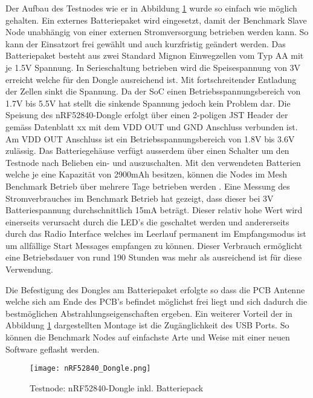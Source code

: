 Der Aufbau des Testnodes wie er in Abbildung \ref{fig:TestnodenRF52840-DongleinklBatteriepack} wurde so einfach wie möglich gehalten. Ein externes Batteriepaket wird eingesetzt, damit der Benchmark Slave Node unabhängig von einer externen Stromversorgung betrieben werden kann. So kann der Einsatzort frei gewählt und auch kurzfristig geändert werden.
Das Batteriepaket besteht aus zwei Standard Mignon Einwegzellen vom Typ AA mit je 1.5V Spannung. In Serieschaltung betrieben wird die Speisespannung von 3V erreicht welche für den Dongle ausreichend ist. Mit fortschreitender Entladung der Zellen sinkt die Spannung. Da der SoC einen Betriebsspannungsbereich von 1.7V bis 5.5V hat stellt die sinkende Spannung jedoch kein Problem dar.
Die Speisung des nRF52840-Dongle erfolgt über einen 2-poligen JST Header der gemäss Datenblatt xx mit dem VDD OUT und GND Anschluss verbunden ist. Am VDD OUT Anschluss ist ein Betriebsspannungsbereich von 1.8V bis 3.6V zulässig.
Das Batteriegehäuse verfügt ausserdem über einen Schalter um den Testnode nach Belieben ein- und auszuschalten.
Mit den verwendeten Batterien welche je eine Kapazität von 2900mAh besitzen, können die Nodes im Mesh Benchmark Betrieb über mehrere Tage betrieben werden \cite{distrelec_schweiz_ag_rnd_2020}.
Eine Messung des Stromverbrauches im Benchmark Betrieb hat gezeigt, dass dieser bei 3V Batteriespannung durchschnittlich 15mA beträgt. Dieser relativ hohe Wert wird einerseits verursacht durch die LED's die geschaltet werden und andererseits durch das Radio Interface welches im Leerlauf permanent im Empfangsmodus ist um allfällige Start Messages empfangen zu können. 
Dieser Verbrauch ermöglicht eine Betriebsdauer von rund 190 Stunden was mehr als ausreichend ist für diese Verwendung.

Die Befestigung des Dongles am Batteriepaket erfolgte so dass die PCB Antenne welche sich am Ende des PCB's befindet möglichst frei liegt und sich dadurch die bestmöglichen Abstrahlungseigenschaften ergeben. Ein weiterer Vorteil der in Abbildung \ref{fig:TestnodenRF52840-DongleinklBatteriepack} dargestellten Montage ist die Zugänglichkeit des USB Ports. So können die Benchmark Nodes auf einfachste Arte und Weise mit einer neuen Software geflasht werden.

 
\begin{figure} [H]
	\centering
	\texttt{[image: nRF52840\_Dongle.png]}
	\caption{Testnode: nRF52840-Dongle inkl. Batteriepack}
	\label{fig:TestnodenRF52840-DongleinklBatteriepack}
\end{figure}

